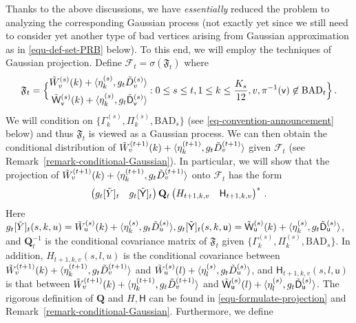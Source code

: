 \documentclass[11pt]{article}
\numberwithin{equation}{section}
\begin{document}
Thanks to the above discussions, we have \emph{essentially} reduced the problem to analyzing the corresponding Gaussian process (not exactly yet since we still need to consider yet another type of bad vertices arising from Gaussian approximation as in \eqref{equ-def-set-PRB} below). To this end, we will employ the techniques of Gaussian projection. Define $\mathcal{F}_t = \sigma(\mathfrak F_t)$ where
\begin{equation}
    \mathfrak{F}_t = \Big\{ \begin{aligned}
    \Tilde{W}^{(s)}_v(k) + \langle \eta^{(s)}_k, g_{t} \Tilde{D}^{(s)}_v \rangle \\ \Tilde{\mathsf{W}}^{(s)}_{\mathsf{v}}(k) + \langle \eta^{(s)}_k, g_{t} \Tilde{\mathsf{D}}^{(s)}_{\mathsf{v}} \rangle \end{aligned} : 0 \leq s \leq t, 1 \leq k \leq \frac{K_s}{12} , v, \pi^{-1}(\mathsf{v}) \not \in \mathrm{BAD}_{t} \Big\}\,. 
    \label{eq-def-mathcal-F-t}
\end{equation} 
We will condition on  $\{\Gamma^{(s)}_k, \Pi^{(s)}_k, \mathrm{BAD}_s\}$ (see \eqref{eq-convention-announcement} below) and thus $\mathfrak F_t$ is viewed as a Gaussian process. We can then obtain the conditional distribution of $\Tilde{W}^{(t+1)}_v(k) + \langle \eta^{(t+1)}_k, g_t \Tilde{D}^{(t+1)}_v \rangle $ given $\mathcal F_t$ (see Remark~\ref{remark-conditional-Gaussian}). In particular, we will show that the projection of $\Tilde{W}^{(t+1)}_v(k) + \langle \eta^{(t+1)}_k, g_t \Tilde{D}^{(t+1)}_v \rangle $ onto $\mathcal{F}_t$ has the form
\begin{align*}
    \begin{pmatrix}
        g_t[\Tilde{Y}]_{t} &
        g_t[\Tilde{\mathsf{Y}}]_{t}
    \end{pmatrix}
    \mathbf{Q}_t     
    \begin{pmatrix}
        H_{t+1,k,v} & \mathsf{H}_{t+1,k,v}  
    \end{pmatrix}^{*}  \,.
\end{align*}
Here $g_{t}[\Tilde{Y}]_{t} (s,k,u) = \Tilde{W}^{(s)}_u(k) + \langle \eta^{(s)}_k, g_{t} \Tilde{D}^{(s)}_u \rangle, g_{t}[\Tilde{\mathsf{Y}}]_{t} (s,k,\mathsf u) = \Tilde{\mathsf W}^{(s)}_{\mathsf u}(k) + \langle \eta^{(s)}_k, g_{t} \Tilde{\mathsf{D}}^{(s)}_{\mathsf u} \rangle$, and $\mathbf{Q}^{-1}_t$ is the  conditional covariance matrix  of $\mathfrak{F}_t$ given $\{\Gamma^{(s)}_k, \Pi^{(s)}_k, \mathrm{BAD}_s\}$. In addition, ${H}_{t+1,k,v}(s,l,u)$ is the conditional covariance between $\Tilde{W}^{(t+1)}_v(k) + \langle \eta^{(t+1)}_k, g_t \Tilde{D}^{(t+1)}_v \rangle$ and $ \Tilde{W}^{(s)}_u(l) + \langle \eta^{(s)}_l, g_t \Tilde{D}^{(s)}_u \rangle$, and $\mathsf{H}_{t+1,k,v}(s,l,\mathsf{u})$ is that between $\Tilde{W}^{(t+1)}_v(k) + \langle \eta^{(t+1)}_k, g_t \Tilde{D}^{(t+1)}_v \rangle$ and $\Tilde{\mathsf{W}}^{(s)}_{\mathsf{u}}(l) + \langle \eta^{(s)}_l, g_t \Tilde{\mathsf{D}}^{(s)}_{\mathsf{u}} \rangle$. The rigorous definition of $\mathbf{Q}$ and $H,\mathsf{H}$ can be found in \eqref{equ-formulate-projection} and Remark~\ref{remark-conditional-Gaussian}. Furthermore, we define
\end{document}
